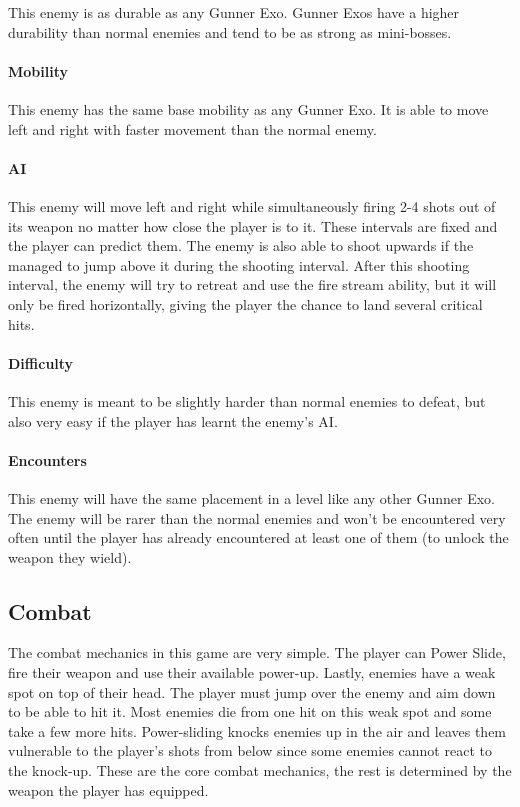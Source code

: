 \documentclass[12pt]{article}
\begin{document}
This enemy is as durable as any Gunner Exo. Gunner Exos have a higher durability than normal enemies and tend to be as strong as mini-bosses. 

\paragraph{Mobility}

This enemy has the same base mobility as any Gunner Exo. It is able to move left and right with faster movement than the normal enemy.

\paragraph{AI}

This enemy will move left and right while simultaneously firing 2-4 shots out of its weapon no matter how close the player is to it. These intervals are fixed and the player can predict them. The enemy is also able to shoot upwards if the managed to jump above it during the shooting interval. After this shooting interval, the enemy will try to retreat and use the fire stream ability, but it will only be fired horizontally, giving the player the chance to land several critical hits. 

\paragraph{Difficulty}

This enemy is meant to be slightly harder than normal enemies to defeat, but also very easy if the player has learnt the enemy's AI. 

\paragraph{Encounters}

This enemy will have the same placement in a level like any other Gunner Exo. The enemy will be rarer than the normal enemies and won't be encountered very often until the player has already encountered at least one of them (to unlock the weapon they wield). 

\subsection{Combat}

The combat mechanics in this game are very simple. The player can Power Slide, fire their weapon and use their available power-up. Lastly, enemies have a weak spot on top of their head. The player must jump over the enemy and aim down to be able to hit it. Most enemies die from one hit on this weak spot and some take a few more hits. Power-sliding knocks enemies up in the air and leaves them vulnerable to the player's shots from below since some enemies cannot react to the knock-up.
These are the core combat mechanics, the rest is determined by the weapon the player has equipped.
\end{document}
